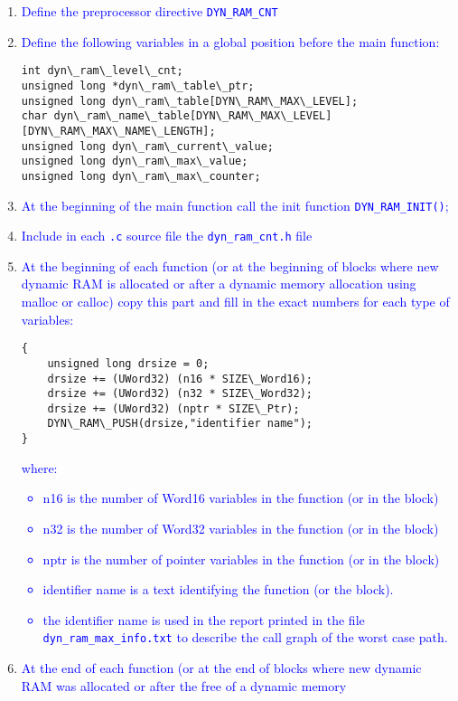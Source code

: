 \begin{enumerate}
\item \textcolor{blue}{%
Define the preprocessor directive {\tt DYN\_RAM\_CNT}
}
\item \textcolor{blue}{%
Define the following variables in a global position before the
main function:
}
\begin{verbatim}
int dyn\_ram\_level\_cnt;
unsigned long *dyn\_ram\_table\_ptr;
unsigned long dyn\_ram\_table[DYN\_RAM\_MAX\_LEVEL];
char dyn\_ram\_name\_table[DYN\_RAM\_MAX\_LEVEL][DYN\_RAM\_MAX\_NAME\_LENGTH];
unsigned long dyn\_ram\_current\_value;
unsigned long dyn\_ram\_max\_value;
unsigned long dyn\_ram\_max\_counter;
\end{verbatim}
\item \textcolor{blue}{%
At the beginning of the main function call the init function
  {\tt DYN\_RAM\_INIT()};
}
\item \textcolor{blue}{%
Include in each {\tt .c} source file the {\tt dyn\_ram\_cnt.h} file
}
\item \textcolor{blue}{%
At the beginning of each function (or at the beginning of blocks
  where new dynamic RAM is allocated or after a dynamic memory
  allocation using malloc or calloc) copy this part and fill in the
  exact numbers for each type of variables:
}
\begin{verbatim}
{
    unsigned long drsize = 0;
    drsize += (UWord32) (n16 * SIZE\_Word16);
    drsize += (UWord32) (n32 * SIZE\_Word32);
    drsize += (UWord32) (nptr * SIZE\_Ptr);
    DYN\_RAM\_PUSH(drsize,"identifier name");
}
\end{verbatim}
\textcolor{blue}{%
where:
\begin{itemize}
\item n16 is the number of Word16 variables in the function (or in the block)
\item n32 is the number of Word32 variables in the function (or in the block)
\item nptr is the number of pointer variables in the function (or in the block)
\item identifier name is a text identifying the function (or the
  block).
\item the identifier name is used in the report printed in the file
{\tt dyn\_ram\_max\_info.txt} to describe the call graph of the worst case
path. 
\end{itemize}
}
\item \textcolor{blue}{%
  At the end of each function (or at the end of blocks where new
  dynamic RAM was allocated or after the free of a dynamic memory
}
\end{enumerate}
